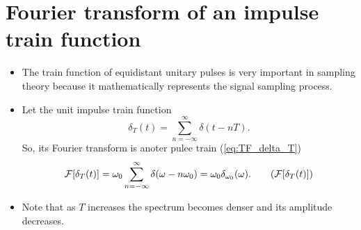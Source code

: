 \section{Fourier transform of an impulse train function}
\begin{itemize}
\item The train function of equidistant unitary pulses is very
  important in sampling theory because it mathematically represents
  the signal sampling process.
\item Let the unit impulse train function
  \begin{equation}
    \delta_T(t) = \sum_{n=-\infty}^{\infty}\delta(t-nT).
    \tag{$\delta_T$}
    \label{eq:delta_T}
  \end{equation}
  So, its Fourier transform is anoter pulee train
  (\ref{eq:TF_delta_T})
  \begin{equation}
    {\cal F}[\delta_T(t)] = \omega_0\sum_{n=-\infty}^{\infty}\delta(\omega-n\omega_0)
    = \omega_0\delta_{\omega_0}(\omega).
    \tag{${\cal F}[\delta_T(t)]$}
    \label{eq:TF_delta_T}
  \end{equation}
\end{itemize}
\begin{itemize}
\item Note that as $T$ increases the spectrum becomes denser and its
  amplitude decreases.
\end{itemize}

